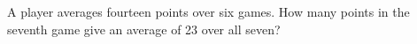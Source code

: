 A player averages fourteen points over six games. How many points in the seventh game give an average of 23 over all seven?
